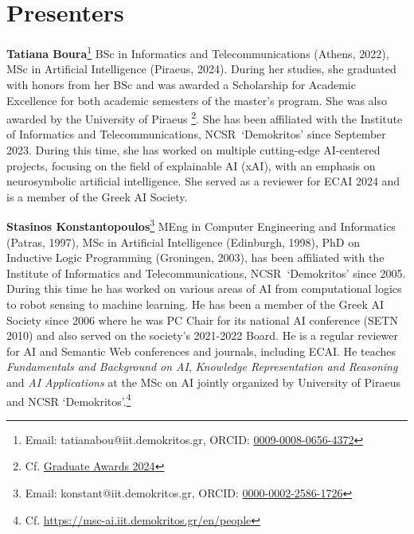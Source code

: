 \documentclass{ecai}
\newcommand{\quotes}[1]{`#1'}
\newcommand{\iit}{Institute of Informatics and Telecommunications, NCSR~\quotes{Demokritos}\xspace}
\begin{document}
\section{Presenters}
\noindent
\textbf{Tatiana Boura}\footnote{Email: tatianabou@iit.demokritos.gr,
  ORCID: \href{https://orcid.org/0009-0008-0656-4372}{0009-0008-0656-4372}}
BSc in Informatics and Telecommunications (Athens, 2022),
MSc in Artificial Intelligence (Piraeus, 2024).
During her studies, she graduated with honors from her BSc and was awarded a Scholarship for Academic Excellence
for both academic semesters of the master's program. She was also awarded by the University of Piraeus
\footnote{Cf. \href{https://msc-ai.iit.demokritos.gr/el/announcements/vraveysi-apofoiton-toy-dpms-tehniti-noimosyni-apo-panepistimio-peiraios}{Graduate Awards 2024}}.
She has been affiliated with the \iit since September 2023.
During this time, she has worked on multiple cutting-edge AI-centered projects, focusing on the field of explainable
AI (xAI), with an emphasis on neurosymbolic artificial intelligence.
She served as a reviewer for ECAI 2024 and is a member of the Greek AI Society.

\noindent
\textbf{Stasinos Konstantopoulos}\footnote{Email: konstant@iit.demokritos.gr,
  ORCID: \href{https://orcid.org/0000-0002-2586-1726}{0000-0002-2586-1726}}
MEng in Computer Engineering and Informatics (Patras, 1997),
MSc in Artificial Intelligence (Edinburgh, 1998),
PhD on Inductive Logic Programming (Groningen, 2003), has been affiliated
with the \iit since 2005. During this time he has worked on various areas
of AI from computational logics to robot sensing to machine learning.
He has been a member of the Greek AI Society since 2006 where he was
PC Chair for its national AI conference (SETN 2010) and also served
on the society's 2021-2022 Board. He is a regular reviewer for AI and
Semantic Web conferences and journals, including ECAI.
He teaches \textit{Fundamentals and Background on AI},
\textit{Knowledge Representation and Reasoning} and
\textit{AI Applications} at the MSc on AI jointly organized by
University of Piraeus and NCSR \quotes{Demokritos}.\footnote{Cf.
  \url{https://msc-ai.iit.demokritos.gr/en/people}}

\end{document}
